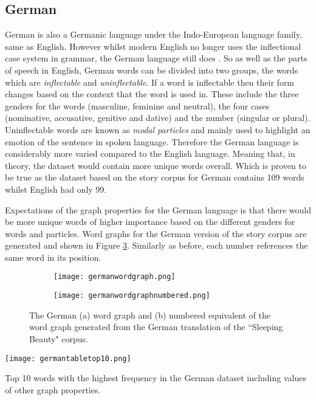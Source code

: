 \subsection{German}
German is also a Germanic language under the Indo-European language family, same as English. However whilst modern English no longer uses the inflectional case system in grammar, the German language still does \cite{durrell2011hammer}. So as well as the parts of speech in English, German words can be divided into two groups, the words which are \emph{inflectable} and \emph{uninflectable}. If a word is inflectable then their form changes based on the context that the word is used in. These include the three genders for the words (masculine, feminine and neutral), the four cases (nominative, accusative, genitive and dative) and the number (singular or plural). Uninflectable words are known as \emph{modal particles} and mainly used to highlight an emotion of the sentence in spoken language. Therefore the German language is considerably more varied compared to the English language. Meaning that, in theory, the dataset would contain more unique words overall. Which is proven to be true as the dataset based on the story corpus for German contains 109 words whilst English had only 99.

Expectations of the graph properties for the German language is that there would be more unique words of higher importance based on the different genders for words and particles. Word graphs for the German version of the story corpus are generated and shown in Figure \ref{fig:gergraph}. Similarly as before, each number references the same word in its position.

\begin{figure}[!htb]
\centering
\begin{subfigure}{.45\textwidth}
	\texttt{[image: germanwordgraph.png]}
	\caption{}
	\label{fig:gerword}
\end{subfigure}
\hfill
\begin{subfigure}{.45\textwidth}
	\hspace{-2cm} 
	\texttt{[image: germanwordgraphnumbered.png]}
	\caption{}
	\label{fig:gernum}
\end{subfigure}
\caption{The German (a) word graph and (b) numbered equivalent of the word graph generated from the German translation of the ``Sleeping Beauty" corpus.}
\label{fig:gergraph}
\end{figure}

\begin{table}[!htb]
\centering
\texttt{[image: germantabletop10.png]}
\caption{Top 10 words with the highest frequency in the German dataset including values of other graph properties. }
\label{table:germantop}
\end{table}

